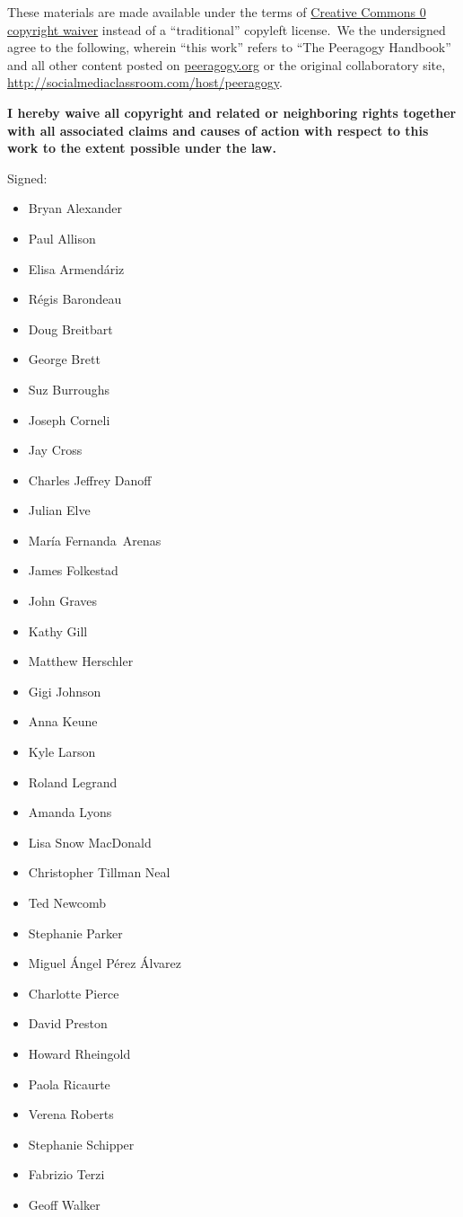 These materials are made available under the terms of
\href{http://creativecommons.org/publicdomain/zero/1.0/}{Creative
Commons 0 copyright waiver} instead of a ``traditional'' copyleft
license.~We the undersigned agree to the following, wherein ``this
work'' refers to ``The Peeragogy Handbook'' and all other content posted
on \href{http://peeragogy.org}{peeragogy.org} or the original
collaboratory site,
\href{http://socialmediaclassroom.com/host/peeragogy}{http://socialmediaclassroom.com/host/peeragogy}.

\textbf{I hereby waive all copyright and related or neighboring rights
together with all associated claims and causes of action with respect to
this work to the extent possible under the law.}

Signed:

\begin{itemize}
\itemsep1pt\parskip0pt
\item
  Bryan Alexander
\item
  Paul Allison
\item
  Elisa Armend\'ariz
\item
  Régis Barondeau
\item
  Doug Breitbart
\item
  George Brett
\item
  Suz Burroughs
\item
  Joseph Corneli
\item
  Jay Cross
\item
  Charles Jeffrey Danoff
\item
  Julian Elve
\item
  María Fernanda~Arenas
\item
  James Folkestad
\item
  John Graves
\item
  Kathy Gill
\item
  Matthew Herschler
\item
  Gigi Johnson
\item
  Anna Keune
\item
  Kyle Larson
\item
  Roland Legrand
\item
  Amanda Lyons
\item
  Lisa Snow MacDonald
\item
  Christopher Tillman Neal
\item
  Ted Newcomb
\item
  Stephanie Parker
\item
  Miguel \'Angel P\'erez \'Alvarez
\item
  Charlotte Pierce
\item
  David Preston
\item
  Howard Rheingold
\item
  Paola Ricaurte
\item
  Verena Roberts
\item
  Stephanie Schipper
\item
  Fabrizio Terzi
\item
  Geoff Walker
\end{itemize}

